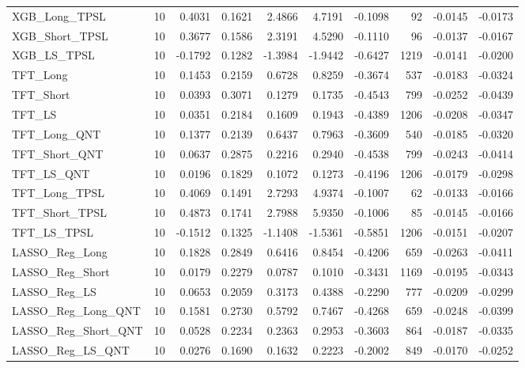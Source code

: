 \begin{tabular}{llrrrrrrrr}
\cline{1-10}
XGB\_Long\_TPSL & 10 & 0.4031 & 0.1621 & 2.4866 & 4.7191 & -0.1098 & 92 & -0.0145 & -0.0173 \\
\cline{1-10}
XGB\_Short\_TPSL & 10 & 0.3677 & 0.1586 & 2.3191 & 4.5290 & -0.1110 & 96 & -0.0137 & -0.0167 \\
\cline{1-10}
XGB\_LS\_TPSL & 10 & -0.1792 & 0.1282 & -1.3984 & -1.9442 & -0.6427 & 1219 & -0.0141 & -0.0200 \\
\cline{1-10}
TFT\_Long & 10 & 0.1453 & 0.2159 & 0.6728 & 0.8259 & -0.3674 & 537 & -0.0183 & -0.0324 \\
\cline{1-10}
TFT\_Short & 10 & 0.0393 & 0.3071 & 0.1279 & 0.1735 & -0.4543 & 799 & -0.0252 & -0.0439 \\
\cline{1-10}
TFT\_LS & 10 & 0.0351 & 0.2184 & 0.1609 & 0.1943 & -0.4389 & 1206 & -0.0208 & -0.0347 \\
\cline{1-10}
TFT\_Long\_QNT & 10 & 0.1377 & 0.2139 & 0.6437 & 0.7963 & -0.3609 & 540 & -0.0185 & -0.0320 \\
\cline{1-10}
TFT\_Short\_QNT & 10 & 0.0637 & 0.2875 & 0.2216 & 0.2940 & -0.4538 & 799 & -0.0243 & -0.0414 \\
\cline{1-10}
TFT\_LS\_QNT & 10 & 0.0196 & 0.1829 & 0.1072 & 0.1273 & -0.4196 & 1206 & -0.0179 & -0.0298 \\
\cline{1-10}
TFT\_Long\_TPSL & 10 & 0.4069 & 0.1491 & 2.7293 & 4.9374 & -0.1007 & 62 & -0.0133 & -0.0166 \\
\cline{1-10}
TFT\_Short\_TPSL & 10 & 0.4873 & 0.1741 & 2.7988 & 5.9350 & -0.1006 & 85 & -0.0145 & -0.0166 \\
\cline{1-10}
TFT\_LS\_TPSL & 10 & -0.1512 & 0.1325 & -1.1408 & -1.5361 & -0.5851 & 1206 & -0.0151 & -0.0207 \\
\cline{1-10}
LASSO\_Reg\_Long & 10 & 0.1828 & 0.2849 & 0.6416 & 0.8454 & -0.4206 & 659 & -0.0263 & -0.0411 \\
\cline{1-10}
LASSO\_Reg\_Short & 10 & 0.0179 & 0.2279 & 0.0787 & 0.1010 & -0.3431 & 1169 & -0.0195 & -0.0343 \\
\cline{1-10}
LASSO\_Reg\_LS & 10 & 0.0653 & 0.2059 & 0.3173 & 0.4388 & -0.2290 & 777 & -0.0209 & -0.0299 \\
\cline{1-10}
LASSO\_Reg\_Long\_QNT & 10 & 0.1581 & 0.2730 & 0.5792 & 0.7467 & -0.4268 & 659 & -0.0248 & -0.0399 \\
\cline{1-10}
LASSO\_Reg\_Short\_QNT & 10 & 0.0528 & 0.2234 & 0.2363 & 0.2953 & -0.3603 & 864 & -0.0187 & -0.0335 \\
\cline{1-10}
LASSO\_Reg\_LS\_QNT & 10 & 0.0276 & 0.1690 & 0.1632 & 0.2223 & -0.2002 & 849 & -0.0170 & -0.0252 \\

\end{tabular}
